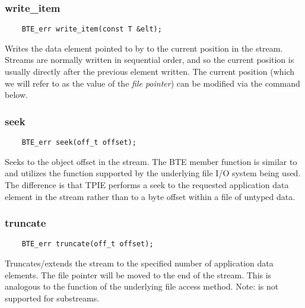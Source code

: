 \subsubsection{write\_item}
\begin{verbatim}
    BTE_err write_item(const T &elt);
\end{verbatim}
Writes the data element pointed to by  to the
current position in the stream. Streams are normally written
in sequential order, and so the current position is usually
directly after the previous element written. The current
position (which we will refer to as the value of the
\emph{file pointer}) can be modified via the 
command below.  


\subsubsection{seek}
\begin{verbatim}
    BTE_err seek(off_t offset);
\end{verbatim}
Seeks to the object offset  in the
stream. The BTE  member function is similar to
and utilizes the  function supported by the
underlying file I/O system being used. The difference is
that TPIE performs a seek to the requested application data
element in the stream rather than to a byte offset within a
file of untyped data. 


\subsubsection{truncate}
\begin{verbatim}
    BTE_err truncate(off_t offset);
\end{verbatim}
Truncates/extends the stream to the specified number of
application data elements. The file
pointer will be moved to
the end of the stream. This is analogous to the
 function of the underlying file access
method. Note:  is not supported for substreams.

